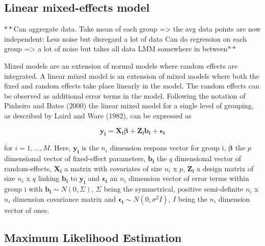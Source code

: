 \documentclass[]{article}
\begin{document}
\hypertarget{linear-mixed-effects-model}{%
\subsection{Linear mixed-effects
model}\label{linear-mixed-effects-model}}

\(\mathbf{**}\)Can aggregate data. Take mean of each group
=\textgreater{} the avg data points are now independent: Less noise but
disregard a lot of data Can do regression on each group =\textgreater{}
a lot of noise but takes all data LMM somewhere in
between\(\mathbf{**}\)

Mixed models are an extension of normal models where random effects are
integrated. A linear mixed model is an extension of mixed models where
both the fixed and random effects take place linearly in the model. The
random effects can be observed as additional error terms in the model.
Following the notation of Pinheiro and Bates (2000) the linear mixed
model for a single level of grouping, as described by Laird and Ware
(1982), can be expressed as

\[
\mathbf{y_i} = \mathbf{X_i}\mathbf{\beta} + \mathbf{Z_i}\mathbf{b_i} + \mathbf{\epsilon_i}
\]

for \(i = 1,...,M\). Here, \(\mathbf{y_i}\) is the \(n_i\) dimension
respons vector for group i, \(\mathbf{\beta}\) the \(p\) dimensional
vector of fixed-effect parameters, \(\mathbf{b_i}\) the \(q\)
dimensional vector of random-effects, \(\mathbf{X_i}\) a matrix with
covariates of size \(n_i\) x \(p\), \(\mathbf{Z_i}\) a design matrix of
size \(n_i\) x \(q\) linking \(\mathbf{b_i}\) to \(\mathbf{y_i}\) and
\(\mathbf{\epsilon_i}\) an \(n_i\) dimension vector of error terms
within group i with \(\mathbf{b_i}\sim N(0,\Sigma)\), \(\Sigma\) being
the symmetrical, positive semi-definite \(n_i\) x \(n_i\) dimension
covariance matrix and \(\mathbf{\epsilon_i}\sim N(0,\sigma^2I)\), \(I\)
being the \(n_i\) dimension vector of ones.

\hypertarget{maximum-likelihood-estimation}{%
\subsection{Maximum Likelihood
Estimation}\label{maximum-likelihood-estimation}}
\end{document}
